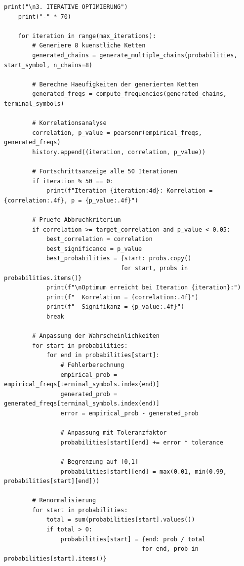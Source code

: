 \documentclass[
  12pt,
  a4paper,
  oneside,
  titlepage
]{article}
\begin{document}
\begin{lstlisting}[caption=Algorithmisch Rekursive Sequenzanalyse 2.0 - Vollständiger Code]
    print("\n3. ITERATIVE OPTIMIERUNG")
    print("-" * 70)
    
    for iteration in range(max_iterations):
        # Generiere 8 kuenstliche Ketten
        generated_chains = generate_multiple_chains(probabilities, start_symbol, n_chains=8)
        
        # Berechne Haeufigkeiten der generierten Ketten
        generated_freqs = compute_frequencies(generated_chains, terminal_symbols)
        
        # Korrelationsanalyse
        correlation, p_value = pearsonr(empirical_freqs, generated_freqs)
        history.append((iteration, correlation, p_value))
        
        # Fortschrittsanzeige alle 50 Iterationen
        if iteration % 50 == 0:
            print(f"Iteration {iteration:4d}: Korrelation = {correlation:.4f}, p = {p_value:.4f}")
        
        # Pruefe Abbruchkriterium
        if correlation >= target_correlation and p_value < 0.05:
            best_correlation = correlation
            best_significance = p_value
            best_probabilities = {start: probs.copy() 
                                 for start, probs in probabilities.items()}
            print(f"\nOptimum erreicht bei Iteration {iteration}:")
            print(f"  Korrelation = {correlation:.4f}")
            print(f"  Signifikanz = {p_value:.4f}")
            break
        
        # Anpassung der Wahrscheinlichkeiten
        for start in probabilities:
            for end in probabilities[start]:
                # Fehlerberechnung
                empirical_prob = empirical_freqs[terminal_symbols.index(end)]
                generated_prob = generated_freqs[terminal_symbols.index(end)]
                error = empirical_prob - generated_prob
                
                # Anpassung mit Toleranzfaktor
                probabilities[start][end] += error * tolerance
                
                # Begrenzung auf [0,1]
                probabilities[start][end] = max(0.01, min(0.99, probabilities[start][end]))
        
        # Renormalisierung
        for start in probabilities:
            total = sum(probabilities[start].values())
            if total > 0:
                probabilities[start] = {end: prob / total 
                                       for end, prob in probabilities[start].items()}
    

\end{lstlisting}
\end{document}

